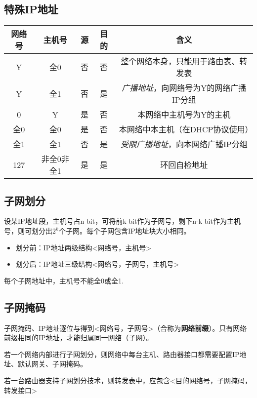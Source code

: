 \subsection{特殊IP地址}
\begin{center}
    \begin{tabular}{c|c|c|c|c}
        \hline
        网络号 & 主机号 & 源 & 目的 & 含义 \\
        \hline
        Y & 全0 & 否 & 否 & 整个网络本身，只能用于路由表、转发表 \\ 
        \hline
        Y & 全1 & 否 & 是 & \textit{广播地址}，向网络号为Y的网络广播IP分组 \\ 
        \hline
        0 & Y & 是 & 否 & 本网络中主机号为Y的主机 \\ 
        \hline
        全0 & 全0 & 是 & 否 & 本网络中本主机（在DHCP协议使用） \\
        \hline
        全1 & 全1 & 否 & 是 & \textit{受限广播地址}，向本网络广播IP分组 \\ 
        \hline
        127 & 非全0非全1 & 是 & 是 & 环回自检地址 \\ 
        \hline
    \end{tabular}
\end{center}


\subsection{子网划分}
设某IP地址段，主机号占n bit，可将前k bit作为子网号，剩下n-k bit作为主机号，则可划分出\(2^k\)个子网。每个子网包含IP地址块大小相同。

\begin{itemize}
    \item 划分前：IP地址两级结构<网络号，主机号>
    \item 划分后：IP地址三级结构<网络号，子网号，主机号>
\end{itemize}

每个子网地址中，主机号不能全0或全1.


\subsection{子网掩码}
子网掩码、IP地址逐位与得到<网络号，子网号>（合称为\textbf{网络前缀}）。只有网络前缀相同的IP地址，才能归属同一网络（子网）。

若一个网络内部进行子网划分，则网络中每台主机、路由器接口都需要配置IP地址、默认网关、子网掩码。

若一台路由器支持子网划分技术，则转发表中，应包含<目的网络号，子网掩码，转发接口>


